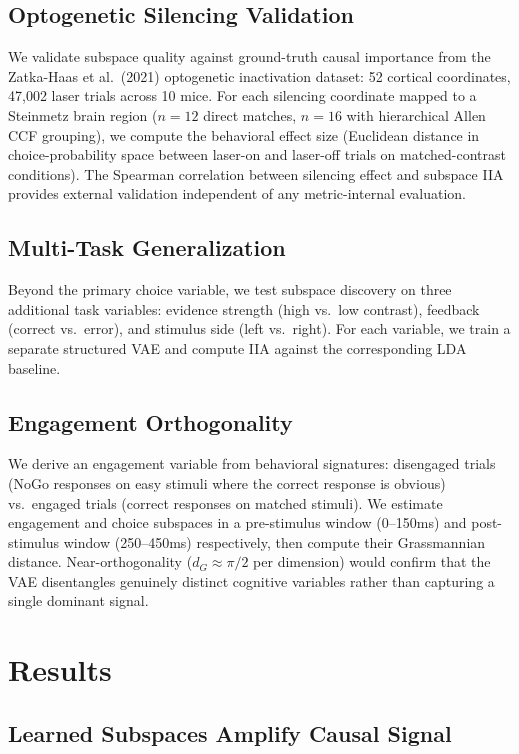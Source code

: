 \documentclass{article}
\begin{document}
\subsection{Optogenetic Silencing Validation}

We validate subspace quality against ground-truth causal importance from the Zatka-Haas et al.\ (2021) optogenetic inactivation dataset: 52 cortical coordinates, 47,002 laser trials across 10 mice. For each silencing coordinate mapped to a Steinmetz brain region ($n = 12$ direct matches, $n = 16$ with hierarchical Allen CCF grouping), we compute the behavioral effect size (Euclidean distance in choice-probability space between laser-on and laser-off trials on matched-contrast conditions). The Spearman correlation between silencing effect and subspace IIA provides external validation independent of any metric-internal evaluation.

\subsection{Multi-Task Generalization}

Beyond the primary choice variable, we test subspace discovery on three additional task variables: evidence strength (high vs.\ low contrast), feedback (correct vs.\ error), and stimulus side (left vs.\ right). For each variable, we train a separate structured VAE and compute IIA against the corresponding LDA baseline.

\subsection{Engagement Orthogonality}

We derive an engagement variable from behavioral signatures: disengaged trials (NoGo responses on easy stimuli where the correct response is obvious) vs.\ engaged trials (correct responses on matched stimuli). We estimate engagement and choice subspaces in a pre-stimulus window (0--150ms) and post-stimulus window (250--450ms) respectively, then compute their Grassmannian distance. Near-orthogonality ($d_G \approx \pi/2$ per dimension) would confirm that the VAE disentangles genuinely distinct cognitive variables rather than capturing a single dominant signal.

\section{Results}

\subsection{Learned Subspaces Amplify Causal Signal}
\end{document}
